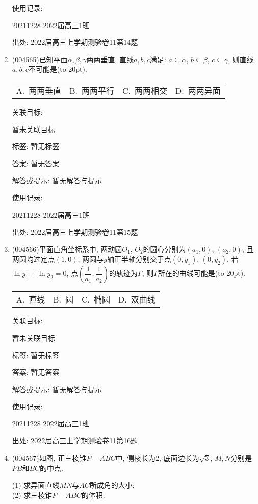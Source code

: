 \documentclass[10pt,a4paper]{article}
\newcommand{\bracket}[1]{(\hbox to #1pt{})}
\newcommand{\fourch}[4]{\par\begin{tabular}{p{.23\textwidth}p{.23\textwidth}p{.23\textwidth}p{.23\textwidth}}
A.~#1 &B.~#2& C.~#3& D.~#4
\end{tabular}}
\begin{document}
\begin{enumerate}[1.]
使用记录:

20211228	2022届高三1班	


出处: 2022届高三上学期测验卷11第14题
\item { (004565)}已知平面$\alpha,\beta,\gamma$两两垂直, 直线$a,b,c$满足: $a\subseteq \alpha$, $b\subseteq \beta$, $c\subseteq \gamma$, 则直线$a,b,c$不可能是\bracket{20}.
\fourch{两两垂直}{两两平行}{两两相交}{两两异面}


关联目标:

暂未关联目标



标签: 暂无标签

答案: 暂无答案

解答或提示: 暂无解答与提示

使用记录:

20211228	2022届高三1班	


出处: 2022届高三上学期测验卷11第15题
\item { (004566)}平面直角坐标系中, 两动圆$O_1$, $O_2$的圆心分别为$(a_1,0)$, $(a_2,0)$, 且两圆均过定点$(1,0)$, 两圆与$y$轴正半轴分别交于点$(0,y_1)$, $(0,y_2)$. 若$\ln y_1+\ln y_2=0$, 点$(\dfrac{1}{a_1},\dfrac{1}{a_2})$的轨迹为$\Gamma$, 则$\Gamma$所在的曲线可能是\bracket{20}.
\fourch{直线}{圆}{椭圆}{双曲线}


关联目标:

暂未关联目标



标签: 暂无标签

答案: 暂无答案

解答或提示: 暂无解答与提示

使用记录:

20211228	2022届高三1班	


出处: 2022届高三上学期测验卷11第16题
\item { (004567)}如图, 正三棱锥$P-ABC$中, 侧棱长为$2$, 底面边长为$\sqrt{3}$, $M,N$分别是$PB$和$BC$的中点.
\begin{center}
\end{center}
(1) 求异面直线$MN$与$AC$所成角的大小;\\
(2) 求三棱锥$P-ABC$的体积.



\end{enumerate}
\end{document}
